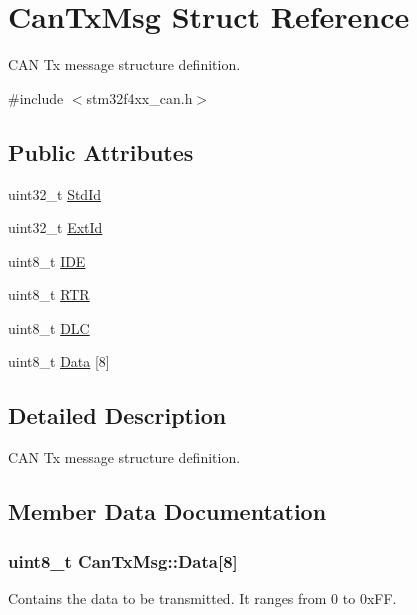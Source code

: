 \hypertarget{struct_can_tx_msg}{}\section{Can\+Tx\+Msg Struct Reference}
\label{struct_can_tx_msg}


C\+A\+N Tx message structure definition.  




{\ttfamily \#include $<$stm32f4xx\+\_\+can.\+h$>$}

\subsection*{Public Attributes}
\begin{DoxyCompactItemize}
\item 
uint32\+\_\+t \hyperlink{struct_can_tx_msg_abfb50c8208227f8cf378f29cf9a3a6f3}{Std\+Id}
\item 
uint32\+\_\+t \hyperlink{struct_can_tx_msg_a33050a95a4cc463b589ff16bdd416f22}{Ext\+Id}
\item 
uint8\+\_\+t \hyperlink{struct_can_tx_msg_aa4c8568a0e3250a17bd7e116b3e09670}{I\+D\+E}
\item 
uint8\+\_\+t \hyperlink{struct_can_tx_msg_a69f84255db38c6910058f290efdb7302}{R\+T\+R}
\item 
uint8\+\_\+t \hyperlink{struct_can_tx_msg_ab49d0fa602aad2fd9cd007adafc11fc2}{D\+L\+C}
\item 
uint8\+\_\+t \hyperlink{struct_can_tx_msg_aabfbf718f627da26d9e3cf903dc0ad02}{Data} \mbox{[}8\mbox{]}
\end{DoxyCompactItemize}


\subsection{Detailed Description}
C\+A\+N Tx message structure definition. 

\subsection{Member Data Documentation}
\hypertarget{struct_can_tx_msg_aabfbf718f627da26d9e3cf903dc0ad02}{}
\subsubsection[{Data}]{\setlength{\rightskip}{0pt plus 5cm}uint8\+\_\+t Can\+Tx\+Msg\+::\+Data\mbox{[}8\mbox{]}}\label{struct_can_tx_msg_aabfbf718f627da26d9e3cf903dc0ad02}
Contains the data to be transmitted. It ranges from 0 to 0x\+F\+F. \hypertarget{struct_can_tx_msg_ab49d0fa602aad2fd9cd007adafc11fc2}{}
